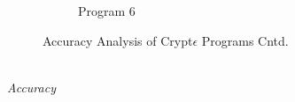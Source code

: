 {\begin{figure}
\begin{subfigure}[b]{0.25\linewidth}
        \caption{Program 6}
        \label{fig:P6}\end{subfigure}
   \caption{Accuracy Analysis of Crypt$\epsilon$ Programs Cntd.}
   \label{accuracy}
\end{figure}

 
\\
\textit{Accuracy}}

